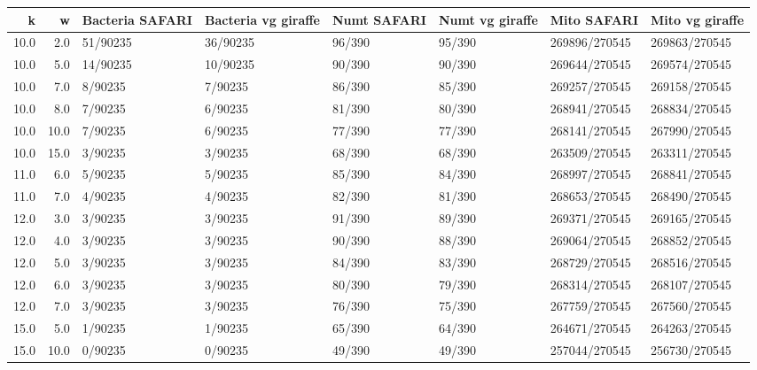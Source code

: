 \begin{tabular}{rrllllll}
\toprule
   k &    w & Bacteria SAFARI & Bacteria vg giraffe & Numt SAFARI & Numt vg giraffe &   Mito SAFARI & Mito vg giraffe \\
\midrule
10.0 &  2.0 &        51/90235 &            36/90235 &      96/390 &          95/390 & 269896/270545 &   269863/270545 \\
10.0 &  5.0 &        14/90235 &            10/90235 &      90/390 &          90/390 & 269644/270545 &   269574/270545 \\
10.0 &  7.0 &         8/90235 &             7/90235 &      86/390 &          85/390 & 269257/270545 &   269158/270545 \\
10.0 &  8.0 &         7/90235 &             6/90235 &      81/390 &          80/390 & 268941/270545 &   268834/270545 \\
10.0 & 10.0 &         7/90235 &             6/90235 &      77/390 &          77/390 & 268141/270545 &   267990/270545 \\
10.0 & 15.0 &         3/90235 &             3/90235 &      68/390 &          68/390 & 263509/270545 &   263311/270545 \\
11.0 &  6.0 &         5/90235 &             5/90235 &      85/390 &          84/390 & 268997/270545 &   268841/270545 \\
11.0 &  7.0 &         4/90235 &             4/90235 &      82/390 &          81/390 & 268653/270545 &   268490/270545 \\
12.0 &  3.0 &         3/90235 &             3/90235 &      91/390 &          89/390 & 269371/270545 &   269165/270545 \\
12.0 &  4.0 &         3/90235 &             3/90235 &      90/390 &          88/390 & 269064/270545 &   268852/270545 \\
12.0 &  5.0 &         3/90235 &             3/90235 &      84/390 &          83/390 & 268729/270545 &   268516/270545 \\
12.0 &  6.0 &         3/90235 &             3/90235 &      80/390 &          79/390 & 268314/270545 &   268107/270545 \\
12.0 &  7.0 &         3/90235 &             3/90235 &      76/390 &          75/390 & 267759/270545 &   267560/270545 \\
15.0 &  5.0 &         1/90235 &             1/90235 &      65/390 &          64/390 & 264671/270545 &   264263/270545 \\
15.0 & 10.0 &         0/90235 &             0/90235 &      49/390 &          49/390 & 257044/270545 &   256730/270545 \\

\end{tabular}
